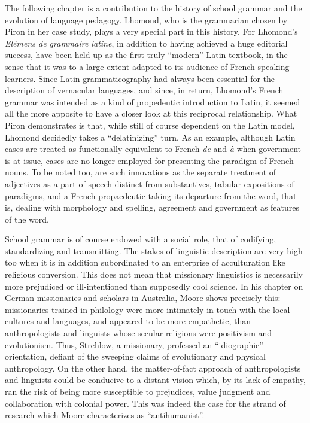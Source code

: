 \documentclass[output=paper]{langsci/langscibook}
\begin{document}
The following chapter is a contribution to the history of school grammar and the evolution of language pedagogy. Lhomond, who is the grammarian chosen by Piron in her case study, plays a very special part in this history. For Lhomond's \emph{Elémens de grammaire latine}, in addition to having achieved a huge editorial success, have been held up as the first truly ``modern'' Latin textbook, in the sense that it was to a large extent adapted to its audience of French-speaking learners. Since Latin grammaticography had always been essential for the description of vernacular languages, and since, in return, Lhomond's French grammar was intended as a kind of propedeutic introduction to Latin, it seemed all the more apposite to have a closer look at this reciprocal relationship. What Piron demonstrates is that, while still of course dependent on the Latin model, Lhomond decidedly takes a ``delatinizing'' turn. As an example, although Latin cases are treated as functionally equivalent to French \emph{de} and \emph{à} when government is at issue, cases are no longer employed for presenting the paradigm of French nouns. To be noted too, are such innovations as the separate treatment of adjectives as a part of speech distinct from substantives, tabular expositions of paradigms, and a French propaedeutic taking its departure from the word, that is, dealing with morphology and spelling, agreement and government as features of the word.

School grammar is of course endowed with a social role, that of codifying, standardizing and transmitting. The stakes of linguistic description are very high too when it is in addition subordinated to an enterprise of acculturation like religious conversion. This does not mean that missionary linguistics is necessarily more prejudiced or ill-intentioned than supposedly cool science. In his chapter on German missionaries and scholars in Australia, Moore shows precisely this: missionaries trained in philology were more intimately in touch with the local cultures and languages, and appeared to be more empathetic, than anthropologists and linguists whose secular religions were positivism and evolutionism. Thus, Strehlow, a missionary, professed an ``idiographic'' orientation, defiant of the sweeping claims of evolutionary and physical anthropology. On the other hand, the matter-of-fact approach of anthropologists and linguists could be conducive to a distant vision which, by its lack of empathy, ran the risk of being more susceptible to prejudices, value judgment and collaboration with colonial power. This was indeed the case for the strand of research which Moore characterizes as ``antihumanist''.
\end{document}
